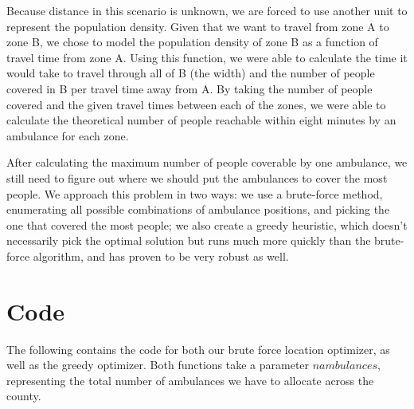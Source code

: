 \documentclass[notitlepage, 12pt]{article}
\begin{document}
Because distance in this scenario is unknown, we are forced to use another unit to represent the population density. Given that we want to travel from zone A to zone B, we chose to model the population density of zone B as a function of travel time from zone A. Using this function, we were able to calculate the time it would take to travel through all of B (the width) and the number of people covered in B per travel time away from A. By taking the number of people covered and the given travel times between each of the zones, we were able to calculate the theoretical number of people reachable within eight minutes by an ambulance for each zone.

After calculating the maximum number of people coverable by one ambulance, we still need to figure out where we should put the ambulances to cover the most people. We approach this problem in two ways: we use a brute-force method, enumerating all possible combinations of ambulance positions, and picking the one that covered the most people; we also create a greedy heuristic, which doesn’t necessarily pick the optimal solution but runs much more quickly than the brute-force algorithm, and has proven to be very robust as well.

\newpage
\appendix
\section{Code}
The following contains the code for both our brute force location optimizer, as well as the greedy optimizer. Both functions take a parameter $nambulances$, representing the total number of ambulances we have to allocate across the county.




\end{document}
